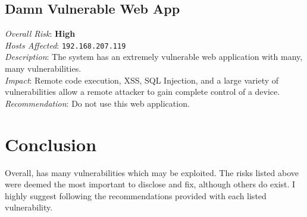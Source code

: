 \documentclass[12pt,titlepage]{article}
\def\theclient{}
\newcommand{\vulnnote}[2]{\noindent \textit{#1}: #2\\}
\newcommand{\risk}[1]{\vulnnote{Overall Risk}{\textbf{#1}}}
\newcommand{\descr}[1]{\vulnnote{Description}{#1}}
\newcommand{\impact}[1]{\vulnnote{Impact}{#1}}
\newcommand{\recommend}[1]{\vulnnote{Recommendation}{#1}}
\newcommand{\hosts}[1]{\vulnnote{Hosts Affected}{\texttt{#1}}}
\newenvironment{vuln}[1]{\subsection{#1}}{}
\begin{document}
\begin{vuln}{Damn Vulnerable Web App}
\risk{High}
\hosts{192.168.207.119}
\descr{The system has an extremely vulnerable web application with many, many vulnerabilities.}
\impact{Remote code execution, XSS, SQL Injection, and a large variety of vulnerabilities allow a remote attacker to gain complete control of a device.}
\recommend{Do not use this web application.}
\end{vuln}

\section{Conclusion}
Overall, \theclient has many vulnerabilities which may be exploited.
The risks listed above were deemed the most important to disclose and fix, although others do exist.
I highly suggest following the recommendations provided with each listed vulnerability.
\end{document}
